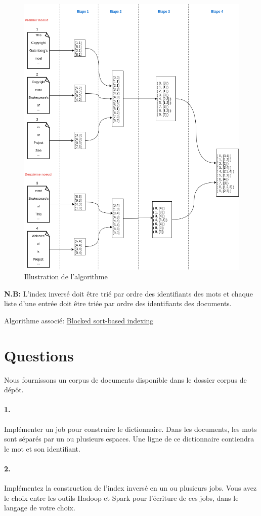\documentclass[12pt,french,titlepage]{article}
\begin{document}
\begin{figure}[H]
    \centering
    \includegraphics[scale=0.6]{images/algorithme}
    \caption{Illustration de l'algorithme}
\end{figure}

\textbf{N.B:} L'index inversé doit être trié par ordre des identifiants des mots et chaque liste d'une entrée doit être triée par ordre des identifiants des documents.

Algorithme associé: \href{https://nlp.stanford.edu/IR-book/html/htmledition/blocked-sort-based-indexing-1.html}{\underline{Blocked sort-based indexing}}

\section{Questions}

Nous fournissons un corpus de documents disponible dans le dossier corpus de dépôt.

\paragraph{1.} Implémenter un job pour construire le dictionnaire. Dans les documents, les mots sont séparés par un ou plusieurs espaces. Une ligne de ce dictionnaire contiendra le mot et son identifiant.

\paragraph{2.} Implémentez la construction de l'index inversé en un ou plusieurs jobs.
\newline
\newline
Vous avez le choix entre les outils Hadoop et Spark pour l'écriture de ces jobs, dans le langage de votre choix.
\end{document}
